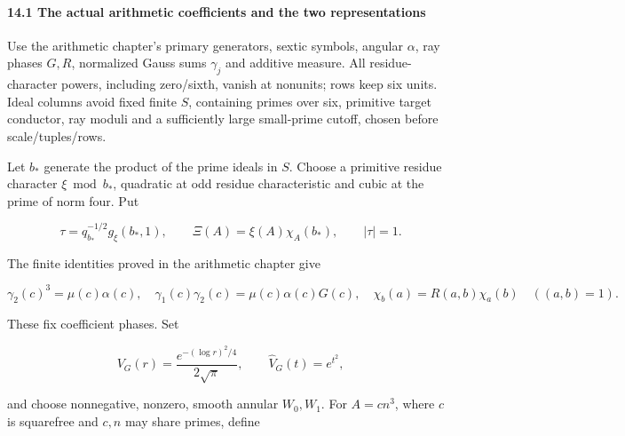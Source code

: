 \hypertarget{dr:probe}{}

\label{dr:probe}

\hypertarget{the-actual-arithmetic-coefficients-and-the-two-representations}{%
\paragraph{14.1 The actual arithmetic coefficients and the two representations}\label{the-actual-arithmetic-coefficients-and-the-two-representations}}

Use the arithmetic chapter's primary generators, sextic symbols, angular \(\alpha\), ray phases \(G,R\), normalized Gauss sums \(\gamma_j\) and additive measure. All residue-character powers, including zero/sixth, vanish at nonunits; rows keep six units. Ideal columns avoid fixed finite \(S\), containing primes over six, primitive target conductor, ray moduli and a sufficiently large small-prime cutoff, chosen before scale/tuples/rows.

Let \(b_*\) generate the product of the prime ideals in \(S\). Choose a primitive residue character \(\xi\bmod b_*\), quadratic at odd residue characteristic and cubic at the prime of norm four. Put

\[
\tau=q_{b_*}^{-1/2}g_\xi(b_*,1),\qquad
 \Xi(A)=\xi(A)\chi_A(b_*),\qquad |\tau|=1.
\]

The finite identities proved in the arithmetic chapter give

\[
\gamma_2(c)^3=\mu(c)\alpha(c),\quad
 \gamma_1(c)\gamma_2(c)=\mu(c)\alpha(c)G(c),\quad
 \chi_b(a)=R(a,b)\chi_a(b)\quad ((a,b)=1).
\]

These fix coefficient phases. Set

\[
V_G(r)=\frac{e^{-(\log r)^2/4}}{2\sqrt\pi},\qquad
 \widehat V_G(t)=e^{t^2},
\]

and choose nonnegative, nonzero, smooth annular \(W_0,W_1\). For \(A=cn^3\), where \(c\) is squarefree and \(c,n\) may share primes, define

\hypertarget{dr:T}{}

\label{dr:T} \hypertarget{dr:I}{}\label{dr:I}

\par\noindent\resizebox{\linewidth}{!}{\begin{minipage}{\dimexpr\linewidth+43.33473pt\relax}\[
\begin{aligned}
 T_{m,a,\eta}(t)
 &=\sum_{c\ {\rm sf},n}
 \gamma_2(c)\overline{\alpha(A)G(A)}\eta(A)\Xi(A)^{-1}
 R(A,a)\chi_A(m)q_c^{-1/2-t}q_n^{-1-3t},\qquad\text{(187)}\\
 I_\eta(X,Y,Z)
 &=\frac1Y\sum_a
 \frac{W_1(q_a/Y)\chi_a(b_*)}
 {\tau\xi(a)\sqrt{q_{b_*}q_aX}}
 \sum_m\xi(m)q_a^{-1/2}g_{\chi_a}(a,-m)
 W_0\left(\frac{q_m}{q_{b_*}q_aX}\right)
 \frac1{2\pi i}\int_{(4)}Z^te^{t^2}T_{m,a,\eta}(t)\,dt.
 \qquad\text{(188)}
\end{aligned}
\]\end{minipage}}\par

